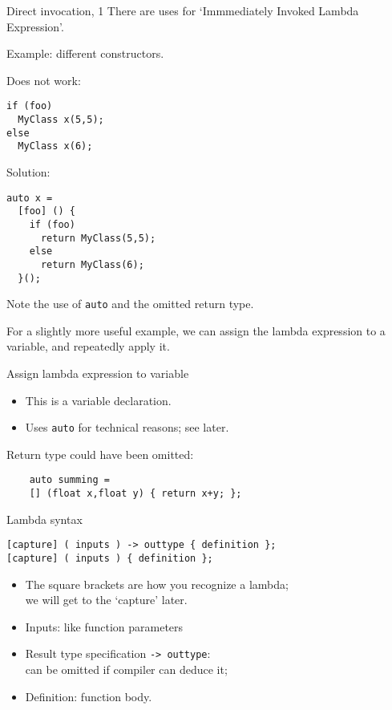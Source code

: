 \begin{block}{Direct invocation, 1}
  \label{sl:lambda-iile}
  There are uses for `Immmediately Invoked Lambda Expression'.

  Example: different constructors.
  \lstset{numbers=left,numberstyle=\tiny}
\begin{multicols}{2}
    Does not work:
\begin{lstlisting}
if (foo)
  MyClass x(5,5);
else
  MyClass x(6);
\end{lstlisting}
\columnbreak
Solution:
\begin{lstlisting}
auto x = 
  [foo] () {
    if (foo)
      return MyClass(5,5);
    else
      return MyClass(6);
  }();
\end{lstlisting}
\end{multicols}
Note the use of \lstinline{auto} and the omitted return type.
\end{block}

For a slightly more useful example,
we can assign the lambda expression to a variable, and repeatedly apply it.

\begin{block}{Assign lambda expression to variable}
  \label{sl:lambdavar}
\def\snippetcodefraction{.67}
\def\snippetanswfraction{.3}  
\begin{itemize}
\item This is a variable declaration.
\item Uses \lstinline+auto+ for technical reasons; see later.
\end{itemize}
Return type could have been omitted:
\begin{lstlisting}
    auto summing = 
    [] (float x,float y) { return x+y; };
\end{lstlisting}
\end{block}

\begin{slide}{Lambda syntax}
  \label{sl:lambda-syntax}
\begin{lstlisting}
[capture] ( inputs ) -> outtype { definition };
[capture] ( inputs ) { definition };  
\end{lstlisting}
  \begin{itemize}
  \item The square brackets are how you recognize a lambda;\\
    we will get to the `capture' later.
  \item Inputs: like function parameters
  \item Result type specification \lstinline+-> outtype+:\\
    can be omitted if compiler can deduce it;
  \item Definition: function body.
  \end{itemize}
\end{slide}

